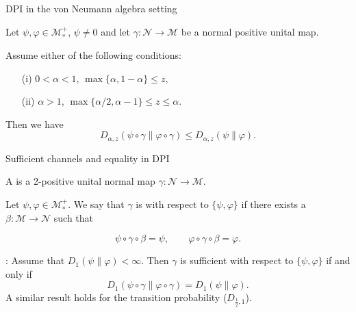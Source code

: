 \documentclass[mathserif]{beamer}
\newcommand{\<}{\langle}
\renewcommand{\>}{\rangle}
\newcommand{\Me}{\mathcal M}
\newcommand{\Ne}{\mathcal N}
\newcommand{\myfootnote}[1]{
    \renewcommand{\thefootnote}{}
    \footnotetext{\hspace{-16.5pt}\scriptsize#1}
    \renewcommand{\thefootnote}{\arabic{footnote}}
}
\begin{document}
\begin{frame}{DPI in the von Neumann algebra setting}

\begin{mybox}[title=Theorem]
Let $\psi,\varphi\in \Me_*^+$, $\psi\ne 0$ and let $\gamma:\Ne\to \Me$ be a normal positive
unital map. 

\bigskip 

Assume either of the following conditions:
\medskip

\begin{enumerate}
\item[(i)] $0<\alpha<1$, $\max\{\alpha,1-\alpha\}\le z$,
\item[(ii)] $\alpha>1$, $\max\{\alpha/2,\alpha-1\}\le z\le \alpha$.
\end{enumerate}

\bigskip

Then we have
\[
D_{\alpha,z}(\psi\circ\gamma\|\varphi\circ\gamma)\le D_{\alpha,z}(\psi\|\varphi).
\]
\end{mybox}

\end{frame}




\begin{frame}{Sufficient channels and equality in DPI}

A  is a 2-positive unital normal map $\gamma:\Ne\to \Me$.

\bigskip

Let $\psi,\varphi\in \Me_*^+$. We say that $\gamma$ is  with respect to
$\{\psi,\varphi\}$ if there exists a  $\beta:\Me\to \Ne$ such that\myfootnote{Petz, 1986, 1988}
\[
\psi\circ \gamma\circ \beta=\psi,\qquad \varphi\circ \gamma\circ \beta=\varphi.
\]

\bigskip

: Assume that $D_1(\psi\|\varphi)<\infty$. Then $\gamma$ is
sufficient with respect to $\{\psi,\varphi\}$ if and only if
\[
D_1(\psi\circ\gamma\|\varphi\circ\gamma)=D_1(\psi\|\varphi).
\]
A similar result holds for the transition probability ($D_{\frac12,1}$).






\end{frame}
\end{document}
